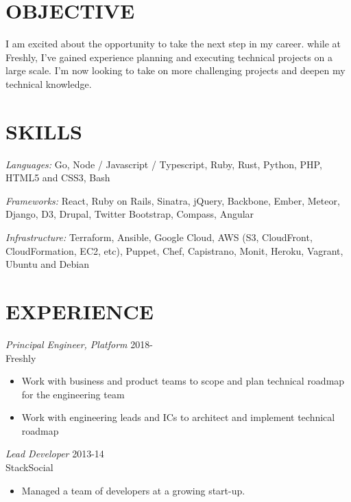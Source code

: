 \documentclass[line,margin]{res}
\begin{document}
\address{q.shanahan@gmail.com}
\address{(641) 233-1123}

\begin{resume}

    \section{OBJECTIVE}

    I am excited about the opportunity to take the next step in my career. while
    at Freshly, I've gained experience planning and executing technical projects on
    a large scale. I'm now looking to take on more challenging projects and deepen
    my technical knowledge.

    \section{SKILLS}
     {\sl Languages:}
    Go, Node / Javascript / Typescript, Ruby, Rust,
    Python, PHP, HTML5 and CSS3, Bash

        {\sl Frameworks:}
    React, Ruby on Rails, Sinatra, jQuery, Backbone, Ember,
    Meteor, Django, D3, Drupal, Twitter Bootstrap, Compass,
    Angular

        {\sl Infrastructure:}
    Terraform, Ansible, Google Cloud, AWS (S3, CloudFront, CloudFormation, EC2, etc),
    Puppet, Chef, Capistrano, Monit, Heroku, Vagrant, Ubuntu and Debian

    \section{EXPERIENCE}
     {\sl Principal Engineer, Platform}
    \hfill 2018- \\
    Freshly
    \begin{itemize} \itemsep -2pt
        \item
              Work with business and product teams to scope and plan technical
              roadmap for the engineering team

        \item
              Work with engineering leads and ICs to architect and implement
              technical roadmap
    \end{itemize}

    {\sl Lead Developer}
    \hfill 2013-14 \\
    StackSocial
    \begin{itemize} \itemsep -2pt
        \item
              Managed a team of developers at a growing start-up.


\end{itemize}
\end{resume}
\end{document}
